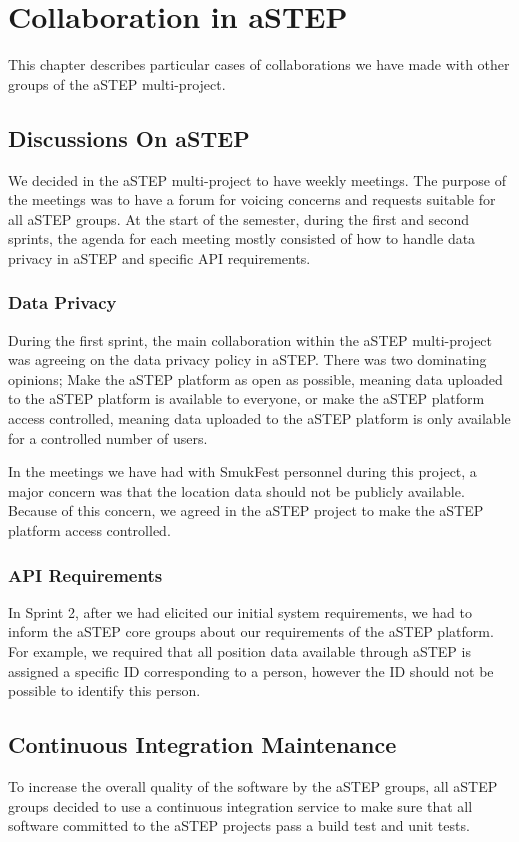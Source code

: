 \chapter{Collaboration in aSTEP}\label{ch:collab}

This chapter describes particular cases of collaborations we have made with other groups of the aSTEP multi-project.

\section{Discussions On aSTEP}
We decided in the aSTEP multi-project to have weekly meetings. The purpose of the meetings was to have a forum for voicing concerns and requests suitable for all aSTEP groups. At the start of the semester, during the first and second sprints, the agenda for each meeting mostly consisted of how to handle data privacy in aSTEP and specific API requirements.

\subsection{Data Privacy}

During the first sprint, the main collaboration within the aSTEP multi-project was agreeing on the data privacy policy in aSTEP. There was two dominating opinions; Make the aSTEP platform as open as possible, meaning data uploaded to the aSTEP platform is available to everyone, or make the aSTEP platform access controlled, meaning data uploaded to the aSTEP platform is only available for a controlled number of users.

In the meetings we have had with SmukFest personnel during this project, a major concern was that the location data should not be publicly available. Because of this concern, we agreed in the aSTEP project to make the aSTEP platform access controlled.

\subsection{API Requirements}
In Sprint 2, after we had elicited our initial system requirements, we had to inform the aSTEP core groups about our requirements of the aSTEP platform. For example, we required that all position data available through aSTEP is assigned a specific ID corresponding to a person, however the ID should not be possible to identify this person.



\section{Continuous Integration Maintenance}
To increase the overall quality of the software by the aSTEP groups, all aSTEP groups decided to use a continuous integration service to make sure that all software committed to the aSTEP projects pass a build test and unit tests.

